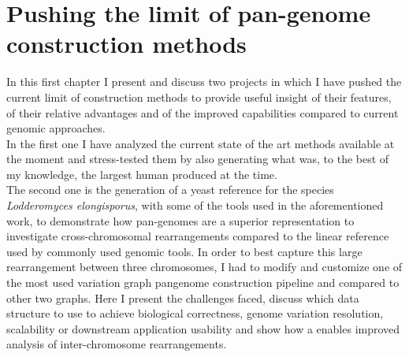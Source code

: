 \chapter{Pushing the limit of pan-genome construction methods}
\label{sec:pushing}
In this first chapter I present and discuss two projects in which I have pushed the current limit of \pangenome construction methods to provide useful insight of their features, of their relative advantages and of the improved capabilities compared to current genomic approaches.\\ In the first one I have analyzed the current state of the art methods available at the moment and stress-tested them by also generating what was, to the best of my knowledge, the largest human \pangenome produced at the time.\\ The second one is the generation of a yeast \pangenome reference for the species \emph{Lodderomyces elongisporus}, with some of the tools used in the aforementioned work, to demonstrate how pan-genomes are a superior representation to investigate cross-chromosomal rearrangements compared to the linear reference used by commonly used genomic tools. In order to best capture this large rearrangement between three chromosomes, I had to modify and customize one of the most used variation graph pangenome construction pipeline and compared to other two graphs. Here I present the challenges faced, discuss which data structure to use to achieve biological correctness, genome variation resolution, scalability or downstream application usability and show how a \pangenome enables improved analysis of inter-chromosome rearrangements.

